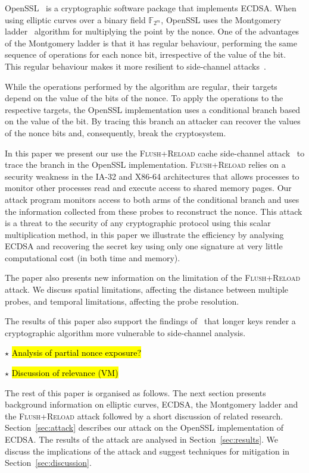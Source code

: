 \documentclass{llncs}
\newcommand{\starpar}[1]{\par{\footnotesize $\star$ \hl{#1}\par}}
\begin{document}
OpenSSL~\cite{openssl} is a cryptographic software package that implements ECDSA.
When using elliptic curves over a binary field $\mathbb{F}_{2^m}$, OpenSSL uses the 
Montgomery ladder~\cite{montgomery87speeding,joye03montgomery} algorithm for multiplying the point by the nonce.
One of the advantages of the Montgomery ladder is that it has regular behaviour, performing
the same sequence of operations for each nonce bit, irrespective of the value of the bit.
This regular behaviour makes it more resilient to side-channel attacks~\cite{joye03montgomery,okeya00elliptic}.

While the operations performed by the algorithm are regular, their targets depend on the value of the bits of the nonce.
To apply the operations to the respective targets, the OpenSSL implementation uses a conditional branch based on the value of the bit.
By tracing this branch an attacker can recover the values of the nonce bits and, consequently, break the cryptosystem.

In this paper we present our use the \textsc{Flush+Reload} cache side-channel attack~\cite{yarom13flush}
to trace the branch in the OpenSSL implementation.
\textsc{Flush+Reload} relies on a security weakness in the IA-32 and X86-64 architectures that allows processes
to monitor other processes read and execute access to shared memory pages.
Our attack program monitors access to both arms of the conditional branch and uses the information
collected from these probes to reconstruct the nonce. This attack is a threat to the security of any cryptographic protocol using this scalar multiplication method, in this paper we illustrate the efficiency by analysing ECDSA and recovering the secret key using only one signature at very little computational cost (in both time and memory).

The paper also presents new information on the limitation of the \textsc{Flush+Reload} attack.
We discuss spatial limitations, affecting the distance between multiple probes, and 
temporal limitations, affecting the probe resolution.

The results of this paper also support the findings of~\cite{walter04longer} that longer keys render a cryptographic algorithm more vulnerable to side-channel analysis.

\starpar{Analysis of partial nonce exposure?}
\starpar{Discussion of relevance (VM)}

The rest of this paper is organised as follows. The next section presents background information on elliptic curves, ECDSA, the Montgomery ladder and the \textsc{Flush+Reload} attack followed by a short discussion of related research.
Section~\ref{sec:attack} describes our attack on the OpenSSL implementation of ECDSA.
The results of the attack are analysed in Section~\ref{sec:results}.
We discuss the implications of the attack and suggest techniques for mitigation in Section~\ref{sec:discussion}.
\end{document}
